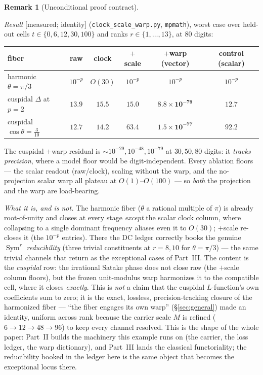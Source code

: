 \documentclass[11pt]{article}
\theoremstyle{definition}
\newtheorem{remark}[theorem]{Remark}
\newcommand{\Sym}{\operatorname{Sym}}
\begin{document}
\begin{remark}[Unconditional proof contract]
\begin{enumerate}
\emph{Result} \textup{[measured; identity]} (\texttt{clock\_scale\_warp.py}, \texttt{mpmath}), worst case over
held-out cells $t\in\{0,6,12,30,100\}$ and ranks $r\in\{1,\dots,13\}$, at $80$ digits:
\begin{center}
\begin{tabular}{lccccc}
\toprule
fiber & raw & clock & $+$scale & $+$warp (vector) & control (scalar) \\
\midrule
harmonic $\theta=\pi/3$ & $10^{-p}$ & $O(30)$ & $10^{-p}$ & $10^{-p}$ & $10^{-p}$ \\
cuspidal $\Delta$ at $p{=}2$ & $13.9$ & $15.5$ & $15.0$ & $\mathbf{8.8\times10^{-79}}$ & $12.7$ \\
cuspidal $\cos\theta=\tfrac{3}{10}$ & $12.7$ & $14.2$ & $63.4$ & $\mathbf{1.5\times10^{-77}}$ & $92.2$ \\
\bottomrule
\end{tabular}
\end{center}
The cuspidal $+$warp residual is $\sim10^{-29},10^{-48},10^{-79}$ at $30,50,80$ digits: it \emph{tracks
precision}, where a model floor would be digit-independent. Every ablation floors --- the scalar readout
(raw/clock), scaling without the warp, and the no-projection scalar warp all plateau at $O(1)$--$O(100)$ --- so
\emph{both} the projection and the warp are load-bearing.

\emph{What it is, and is not.} The harmonic fiber ($\theta$ a rational multiple of $\pi$) is already
root-of-unity and closes at every stage \emph{except} the scalar clock column, where collapsing to a single
dominant frequency aliases even it to $O(30)$; $+$scale re-closes it (the $10^{-p}$ entries). There the DC ledger
correctly books the genuine $\Sym^r$
\emph{reducibility} (three trivial constituents at $r=8,10$ for $\theta=\pi/3$) --- the same trivial channels
that return as the exceptional cases of Part~III. The content is the \emph{cuspidal} row: the irrational Satake
phase does not close raw (the $+$scale column floors), but the frozen unit-modulus warp harmonizes it to the
compatible cell, where it closes \emph{exactly}. This is \emph{not} a claim that the cuspidal $L$-function's own
coefficients sum to zero; it is the exact, lossless, precision-tracking closure of the harmonized fiber ---
``the fiber engages its own warp'' (\S\ref{sec:general}) made an identity, uniform across rank because the
carrier scale $M$ is refined ($6\to12\to48\to96$) to keep every channel resolved. This is the shape of the
whole paper: Part~II builds the machinery this example runs on (the carrier, the loss ledger, the warp
dictionary), and Part~III lands the classical functoriality; the reducibility booked in the ledger here is the
same object that becomes the exceptional locus there.


\end{enumerate}
\end{remark}
\end{document}
